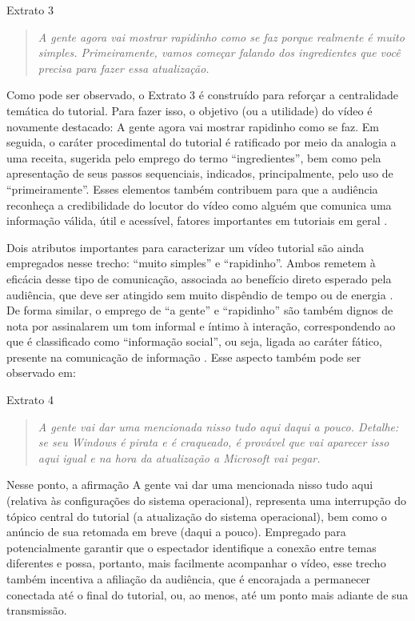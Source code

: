 \documentclass[portuguese]{textolivre}
\begin{document}
\vspace{1ex}
Extrato 3
\begin{quote}
    \textit{A gente agora vai mostrar rapidinho como se faz porque realmente é muito simples. Primeiramente, vamos começar falando dos ingredientes que você precisa para fazer essa atualização.}
\end{quote}

Como pode ser observado, o Extrato 3 é construído para reforçar a centralidade temática do tutorial. Para fazer isso, o objetivo (ou a utilidade) do vídeo é novamente destacado: A gente agora vai mostrar rapidinho como se faz. Em seguida, o caráter procedimental do tutorial é ratificado por meio da analogia a uma receita, sugerida pelo emprego do termo “ingredientes”, bem como pela apresentação de seus passos sequenciais, indicados, principalmente, pelo uso de “primeiramente”. Esses elementos também contribuem para que a audiência reconheça a credibilidade do locutor do vídeo como alguém que comunica uma informação válida, útil e acessível, fatores importantes em tutoriais em geral \cite{tarquini2019}.

Dois atributos importantes para caracterizar um vídeo tutorial são ainda empregados nesse trecho: “muito simples” e “rapidinho”. Ambos remetem à eficácia desse tipo de comunicação, associada ao benefício direto esperado pela audiência, que deve ser atingido sem muito dispêndio de tempo ou de energia \cite{xie2021}. De forma similar, o emprego de “a gente” e “rapidinho” são também dignos de nota por assinalarem um tom informal e íntimo à interação, correspondendo ao que é classificado como “informação social”, ou seja, ligada ao caráter fático, presente na comunicação de informação \cite{zuckerman2016}. Esse aspecto também pode ser observado em:

\vspace{1ex}
Extrato 4
\begin{quote}
    \textit{A gente vai dar uma mencionada nisso tudo aqui daqui a pouco. Detalhe: se seu Windows é pirata e é craqueado, é provável que vai aparecer isso aqui igual e na hora da atualização a Microsoft vai pegar.}
\end{quote}


Nesse ponto, a afirmação A gente vai dar uma mencionada nisso tudo aqui (relativa às configurações do sistema operacional), representa uma interrupção do tópico central do tutorial (a atualização do sistema operacional), bem como o anúncio de sua retomada em breve (daqui a pouco). Empregado para potencialmente garantir que o espectador identifique a conexão entre temas diferentes e possa, portanto, mais facilmente acompanhar o vídeo, esse trecho também incentiva a afiliação da audiência, que é encorajada a permanecer conectada até o final do tutorial, ou, ao menos, até um ponto mais adiante de sua transmissão.
\end{document}
